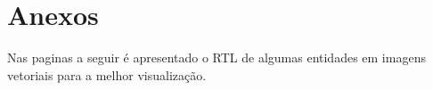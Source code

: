 \documentclass[12pt, a4paper]{article}
\begin{document}
	\section{Anexos}
	
	Nas paginas a seguir é apresentado o RTL de algumas entidades em imagens vetoriais para a melhor visualização.
	
	
	
	
	
	
	
	

	
	
\end{document}
